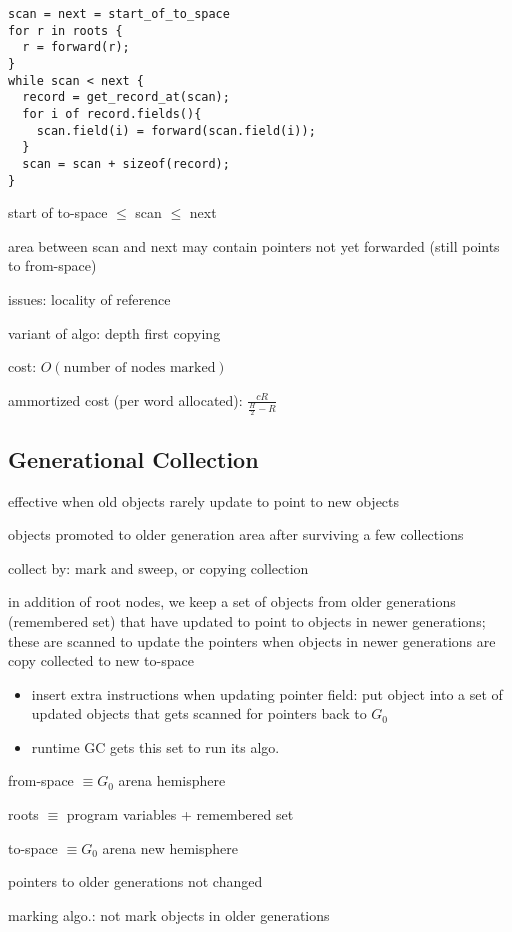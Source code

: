 \documentclass[8pt]{extarticle}
\begin{document}
\begin{multicols*}{2}
\begin{verbatim}
scan = next = start_of_to_space
for r in roots {
  r = forward(r);
}
while scan < next {
  record = get_record_at(scan);
  for i of record.fields(){
    scan.field(i) = forward(scan.field(i));
  }
  scan = scan + sizeof(record);
}
\end{verbatim}
  
  start of to-space $\leq$ scan $\leq$ next

  area between scan and next may contain pointers not yet forwarded (still points to from-space)

  issues: locality of reference

  variant of algo: depth first copying

  cost: $O(\text{number of nodes marked})$

  ammortized cost (per word allocated): $\frac{c R}{\frac{H}{2} - R}$


  \subsection{Generational Collection}

  effective when old objects rarely update to point to new objects

  objects promoted to older generation area after surviving a few collections

  collect by: mark and sweep, or copying collection

  in addition of root nodes, we keep a set of objects from older generations (remembered set) that have updated to point to objects in newer generations; these are scanned to update the pointers when objects in newer generations are copy collected to new to-space
  \begin{itemize}
  \item insert extra instructions when updating pointer field: put object into a set of updated objects that gets scanned for pointers back to $G_0$
  \item runtime GC gets this set to run its algo.
  \end{itemize}
  
  from-space $\equiv G_0$ arena hemisphere

  roots $\equiv$ program variables + remembered set

  to-space $\equiv G_0$ arena new hemisphere

  pointers to older generations not changed

  marking algo.: not mark objects in older generations


\end{multicols*}
\end{document}
